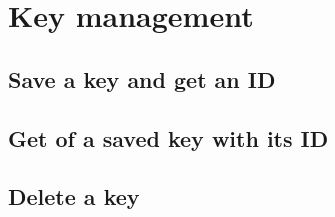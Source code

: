 \chapter{Key management}
\label{keyMan}

\section{Save a key and get an ID}

\section{Get of a saved key with its ID}

\section{Delete a key}